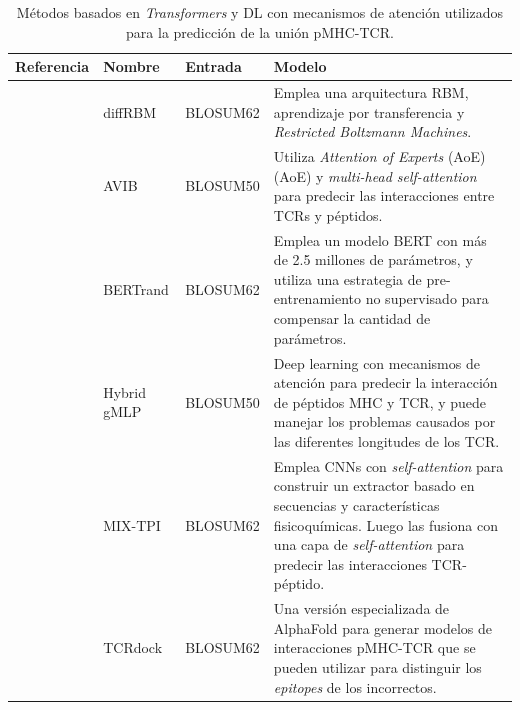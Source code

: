 \begin{table}[ht]
	\caption{Métodos basados en \textit{Transformers} y DL con mecanismos de atención utilizados para la predicción de la unión pMHC-TCR.}
	\label{tab:TCR}
	\setlength{\tabcolsep}{0.5em} %
	{\renewcommand{\arraystretch}{1.1}%
		
		\begin{scriptsize}
		\begin{tabular}{p{2.5cm}p{2.5cm}p{2cm}p{6.2cm}}
			\multicolumn{1}{l}{\textbf{Referencia}}                                   & \textbf{Nombre}          & \textbf{Entrada}              & \textbf{Modelo}     \\  \midrule
			
			\cite{bravi2023transfer}	&	diffRBM	&	BLOSUM62	 &	Emplea una arquitectura RBM, aprendizaje por transferencia y \textit{Restricted Boltzmann Machines}.	\\%
			
			\cite{10.1093/bioinformatics/btac820}	&	AVIB	&	BLOSUM50	&	Utiliza \textit{Attention of Experts} (AoE) (AoE) y \textit{multi-head self-attention} para predecir las interacciones entre TCRs y péptidos.	\\
			
			\cite{myronov2023bertrand}	&	BERTrand	&	BLOSUM62	&	Emplea un modelo BERT con más de 2.5 millones de parámetros, y utiliza una estrategia de pre-entrenamiento no supervisado para compensar la cantidad de parámetros.\\ %
			
			\cite{zhang2023hybrid}	&	Hybrid gMLP 	&	BLOSUM50	&	Deep learning con mecanismos de atención para predecir la interacción de péptidos MHC y TCR, y puede manejar los problemas causados por las diferentes longitudes de los TCR.\\
			
		
			
			\cite{yang2023mix}	&	MIX-TPI	&	BLOSUM62	&	Emplea CNNs con \textit{self-attention} para construir un extractor basado en secuencias y características fisicoquímicas. Luego las fusiona con una capa de \textit{self-attention} para predecir las interacciones TCR-péptido.\\
			
			\cite{bradley2023structure}	&	TCRdock	&	BLOSUM62	&	Una versión especializada de AlphaFold para generar modelos de interacciones pMHC-TCR que se pueden utilizar para distinguir los \textit{epitopes} de los incorrectos. 	\\
			

\end{tabular}
\end{scriptsize}}
\end{table}
